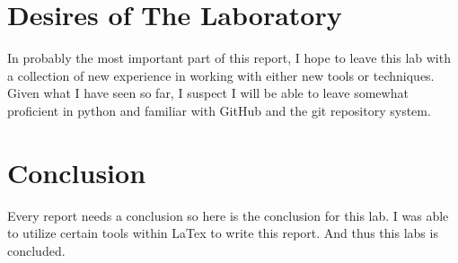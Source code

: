 \documentclass[12pt,a4paper]{article}
\begin{document}
\section{Desires of The Laboratory}
In probably the most important part of this report, I hope to leave this lab with a collection of new experience in working with either new tools or techniques. Given what I have seen so far, I suspect I will be able to leave somewhat proficient in python and familiar with GitHub and the git repository system.  

\section{Conclusion}

Every report needs a conclusion so here is the conclusion for this lab. I was able to utilize certain tools within LaTex to write this report. And thus this labs is concluded.
\end{document}
